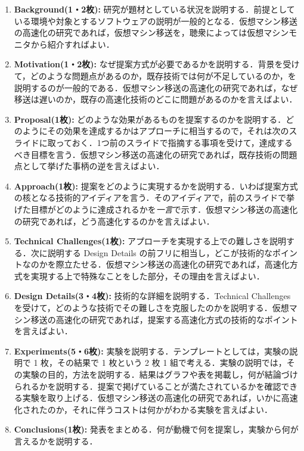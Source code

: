 \documentclass[a4j]{jarticle}
\begin{document}
\begin{enumerate}
 \item \textbf{Background(1・2枚):} 研究が題材としている状況を説明する．前提としている環境や対象とするソフトウェアの説明が一般的となる．仮想マシン移送の高速化の研究であれば，仮想マシン移送を，聴衆によっては仮想マシンモニタから紹介すればよい．

 \item \textbf{Motivation(1・2枚):} なぜ提案方式が必要であるかを説明する．背景を受けて，どのような問題点があるのか，既存技術では何が不足しているのか，を説明するのが一般的である．仮想マシン移送の高速化の研究であれば，なぜ移送は遅いのか，既存の高速化技術のどこに問題があるのかを言えばよい．

 \item \textbf{Proposal(1枚):} どのような効果があるものを提案するのかを説明する．どのようにその効果を達成するかはアプローチに相当するので，それは次のスライドに取っておく．1つ前のスライドで指摘する事項を受けて，達成するべき目標を言う．仮想マシン移送の高速化の研究であれば，既存技術の問題点として挙げた事柄の逆を言えばよい．
   
 \item \textbf{Approach(1枚):} 提案をどのように実現するかを説明する．いわば提案方式の核となる技術的アイディアを言う．そのアイディアで，前のスライドで挙げた目標がどのように達成されるかを\emph{一言}で示す．仮想マシン移送の高速化の研究であれば，どう高速化するのかを言えばよい．

 \item \textbf{Technical Challenges(1枚):} アプローチを実現する上での難しさを説明する．次に説明する Design Details の前フリに相当し，どこが技術的なポイントなのかを際立たせる．仮想マシン移送の高速化の研究であれば，高速化方式を実現する上で特殊なことをした部分，その理由を言えばよい．

 \item \textbf{Design Details(3・4枚):} 技術的な詳細を説明する．Technical Challenges を受けて，どのような技術でその難しさを克服したのかを説明する．仮想マシン移送の高速化の研究であれば，提案する高速化方式の技術的なポイントを言えばよい．

 \item \textbf{Experiments(5・6枚):} 実験を説明する．テンプレートとしては，実験の説明で 1 枚，その結果で 1 枚という 2 枚 1 組で考える．実験の説明では，その実験の目的，方法を説明する．結果はグラフや表を掲載し，何が結論づけられるかを説明する．提案で掲げていることが満たされているかを確認できる実験を取り上げる．仮想マシン移送の高速化の研究であれば，いかに高速化されたのか，それに伴うコストは何かがわかる実験を言えばよい．

 \item \textbf{Conclusions(1枚):} 発表をまとめる．何が動機で何を提案し，実験から何が言えるかを説明する．

\end{enumerate}
\end{document}
